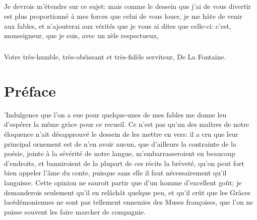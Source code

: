 \documentclass{book}
\begin{document}
\paragraph{}
Je devrois m'\'etendre sur ce sujet: mais comme le dessein que j'ai de vous divertir est plus proportionn\'e \`a mes forces que celui de vous louer, je me h\^ate de venir aux fables, et n'ajouterai aux v\'erit\'es que je vous ai dites que celle-ci: c'est, monseigneur, que je suis, avec un z\`ele respectueux,
\paragraph{}
Votre tr\`es-humble, tr\`es-ob\'eissant et tr\`es-fid\`ele serviteur,
De La Fontaine.
\chapter*{Pr\'eface}
'Indulgence que l'on a eue pour quelque-unes de mes fables me donne leu d'esp\'erer la m\^eme gr\`ace pour ce recueil. Ce n'est pas qu'un des ma\^itres de notre \'eloquence n'ait d\'esapprouv\'e le dessein de les mettre en vers: il a cru que leur principal ornement est de n'en avoir aucun, que d'ailleurs la contrainte de la po\'esie, jointe \`a la s\'ev\'erit\'e de notre langue, m'embarrasseroient en beaucoup d'endroits, et banniroient de la plupart de ces r\'ecits la br\`evet\'e, qu'on peut fort bien appeler l'\^ame du conte, puisque sans elle il faut n\'ecessairement qu'il languisse. Cette opinion ne sauroit partir que d'un homme d'excellent go\^ut; je demanderois seulement qu'il en rel\^ach\^at quelque peu, et qu'il cr\^ut que les Gr\^aces lac\'ed\'emoniennes ne sont pas tellement ennemies des Muses fran\c coises, que l'on ne puisse souvent les faire marcher de compagnie.
\end{document}
